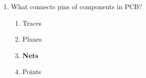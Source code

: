 \documentclass[a4paper,12pt]{article}
\begin{document}
\begin{enumerate}
		\item What connects pins of components in PCB?
		\begin{enumerate}
			\item Traces
			\item Planes
			\item \textbf{Nets}
			\item Points
		\end{enumerate}
			\end{enumerate}
		
\end{document}
